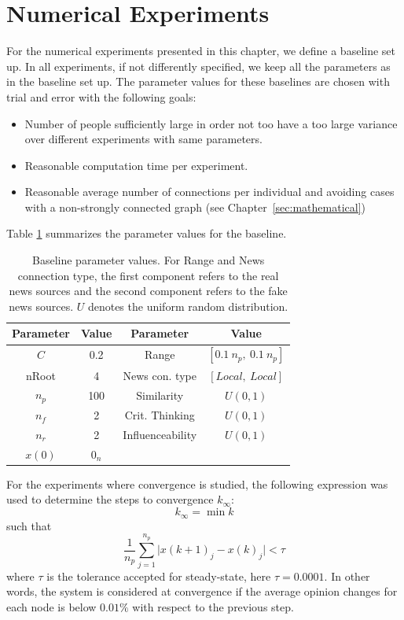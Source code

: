 \section{Numerical Experiments}
\label{sec:experiments}

For the numerical experiments presented in this chapter, we define a baseline set up. In all experiments, if not differently specified, we keep all the parameters as in the baseline set up. 
The parameter values for these baselines are chosen with trial and error with the following goals:

\begin{itemize}
	\item
	Number of people sufficiently large in order not too have a too large variance over different experiments with same parameters.
	\item
	Reasonable computation time per experiment.
	\item
	Reasonable average number of connections per individual and avoiding cases with a non-strongly connected graph (see Chapter~\ref{sec:mathematical})
\end{itemize}


Table \ref{table:1} summarizes the parameter values for the baseline.
\begin{table}[h!]
\centering
\begin{tabular}{||c | c || c | c ||}
	\hline
	Parameter&Value&Parameter&Value\\
	\hline
	$C$&0.2&Range& $[ 0.1\ n_p,\ 0.1\ n_p]$\\
	nRoot&4&News con. type&$[Local,\ Local]$\\
	$n_p$&100&Similarity&$U(0,1)$\\
	$n_f$&2&Crit. Thinking&$U(0,1)$\\
	$n_r$&2&Influenceability&$U(0,1)$\\
	$x(0)$& $0_{n}$ & &\\
	\hline
\end{tabular}
\newline
\caption{Baseline parameter values. For Range and News connection type, the first component refers to the real news sources and the second component refers to the fake news sources. $U$ denotes the uniform random distribution.}
\label{table:1}
\end{table}


For the experiments where convergence is studied, the following expression was used to determine the steps to convergence $k_{\infty}:$
$$
k_{\infty}=\min k$$
such that
$$ \frac{1}{n_p} \sum_{j=1}^{n_p} \vert x(k+1)_j-x(k)_j \vert <  \tau
$$
where $\tau$ is the tolerance accepted for steady-state, here
$\tau = 0.0001$. In other words, the system is considered at convergence if the average opinion changes for each node is below $0.01\% $ with respect to the previous step.



